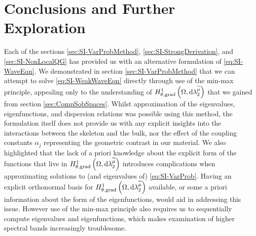 \section{Conclusions and Further Exploration} \label{sec:SI-Conc}
Each of the sections \ref{sec:SI-VarProbMethod}, \ref{sec:SI-StrongDerivation}, and \ref{sec:SI-NonLocalQG} has provided us with an alternative formulation of \eqref{eq:SI-WaveEqn}.
We demonstrated in section \ref{sec:SI-VarProbMethod} that we can attempt to solve \eqref{eq:SI-WeakWaveEqn} directly through use of the min-max principle, appealing only to the understanding of $H^1_{\theta, \mathrm{grad}}\left( \Omega, \mathrm{d}\lambda_2^{\widetilde{\mu}} \right)$ that we gained from section \ref{sec:CompSobSpaces}.
Whilst approximation of the eigenvalues, eigenfunctions, and dispersion relations was possible using this method, the formulation itself does not provide us with any explicit insights into the interactions between the skeleton and the bulk, nor the effect of the coupling constants $\alpha_j$ representing the geometric contrast in our material.
We also highlighted that the lack of a priori knowledge about the explicit form of the functions that live in $H^1_{\theta, \mathrm{grad}}\left( \Omega, \mathrm{d}\lambda_2^{\widetilde{\mu}} \right)$ introduces complications when approximating solutions to (and eigenvalues of) \eqref{eq:SI-VarProb}.
Having an explicit orthonormal basis for $H^1_{\theta, \mathrm{grad}}\left( \Omega, \mathrm{d}\lambda_2^{\widetilde{\mu}} \right)$ available, or some a priori information about the form of the eigenfunctions, would aid in addressing this issue.
However use of the min-max principle also requires us to sequentially compute eigenvalues and eigenfunctions, which makes examination of higher spectral bands increasingly troublesome.

